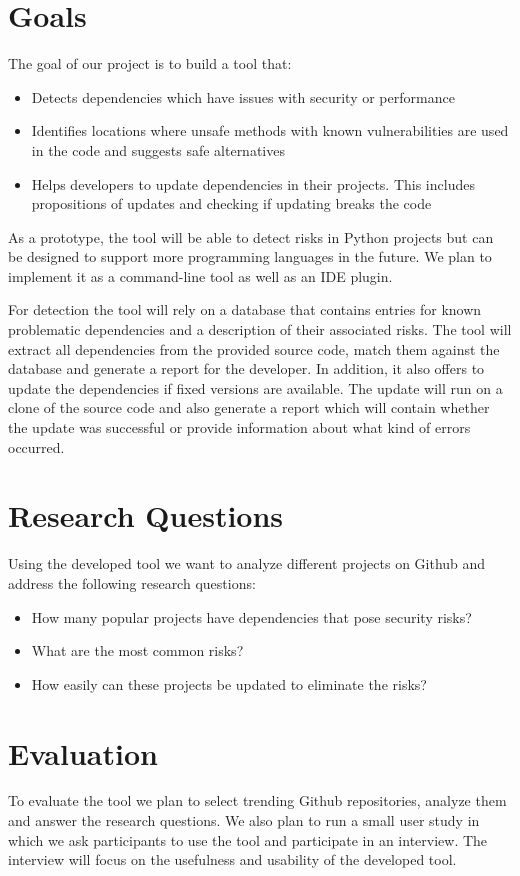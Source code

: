 \documentclass[sigconf]{acmart}
\begin{document}
\section{Goals}

The goal of our project is to build a tool that:
\begin{itemize}
\item Detects dependencies which have issues with security or performance
\item Identifies locations where unsafe methods with known vulnerabilities are used in the code and suggests safe alternatives 
\item Helps developers to update dependencies in their projects. This includes propositions of updates and checking if updating breaks the code
\end{itemize}


As a prototype, the tool will be able to detect risks in Python projects but can be designed to support more programming languages in the future. We plan to implement it as a command-line tool as well as an IDE plugin. 

For detection the tool will rely on a database that contains entries for known problematic dependencies and a description of their associated risks. The tool will extract all dependencies from the provided source code, match them against the database and generate a report for the developer. In addition, it also offers to update the dependencies if fixed versions are available. The update will run on a clone of the source code and also generate a report which will contain whether the update was successful or provide information about what kind of errors occurred. 


\section{Research Questions}

Using the developed tool we want to analyze different projects on Github and address the following research questions:
\begin{itemize}
\item How many popular projects have dependencies that pose security risks?
\item What are the most common risks?
\item How easily can these projects be updated to eliminate the risks?
\end{itemize}

\section{Evaluation}

To evaluate the tool we plan to select trending Github repositories, analyze them and answer the research questions. We also plan to run a small user study in which we ask participants to use the tool and participate in an interview. The interview will focus on the usefulness and usability of the developed tool.
\end{document}
